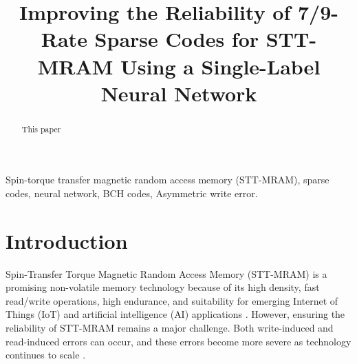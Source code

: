 \documentclass[conference]{IEEEtran}
\begin{document}
\title{Improving the Reliability of 7/9-Rate Sparse Codes for STT-MRAM Using a Single-Label Neural Network\\}


\author{


}

\maketitle

\begin{abstract}

This paper 

\end{abstract}


\begin{IEEEkeywords}
Spin-torque transfer magnetic random access memory (STT-MRAM), sparse codes, neural network, BCH codes, Asymmetric write error.
\end{IEEEkeywords}



\section{Introduction}

Spin-Transfer Torque Magnetic Random Access Memory (STT-MRAM) is a promising non-volatile memory technology because of its high density, fast read/write operations, high endurance, and suitability for emerging Internet of Things (IoT) and artificial intelligence (AI) applications \cite{girard2020survey}. However, ensuring the reliability of STT-MRAM remains a major challenge. Both write-induced and read-induced errors can occur, and these errors become more severe as technology continues to scale \cite{hemaram2025asymmetric}.
\end{document}
